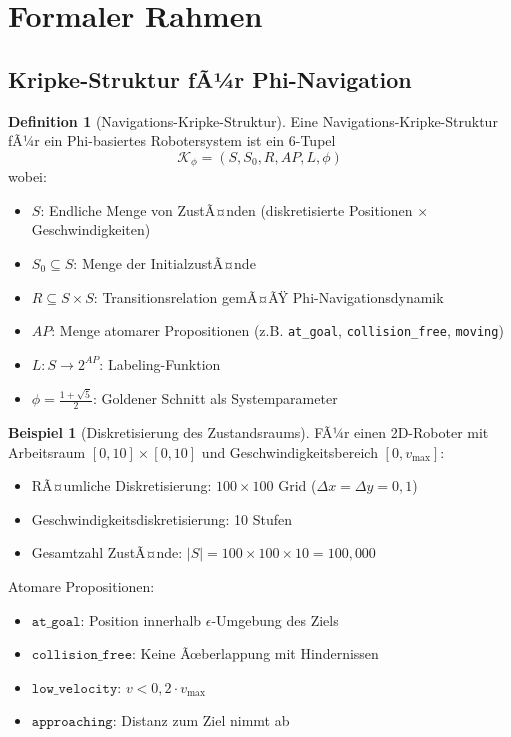 ﻿\documentclass[a4paper,12pt]{article}
\theoremstyle{definition}
\newtheorem{definition}{Definition}[section]
\newtheorem{beispiel}{Beispiel}[section]
\begin{document}
\section{Formaler Rahmen}

\subsection{Kripke-Struktur fÃ¼r Phi-Navigation}

\begin{definition}[Navigations-Kripke-Struktur]
Eine Navigations-Kripke-Struktur fÃ¼r ein Phi-basiertes Robotersystem ist ein 6-Tupel
\[
\mathcal{K}_{\phi} = (S, S_0, R, AP, L, \phi)
\]
wobei:
\begin{itemize}
	\item $S$: Endliche Menge von ZustÃ¤nden (diskretisierte Positionen $\times$ Geschwindigkeiten)
	\item $S_0 \subseteq S$: Menge der InitialzustÃ¤nde
	\item $R \subseteq S \times S$: Transitionsrelation gemÃ¤ÃŸ Phi-Navigationsdynamik
	\item $AP$: Menge atomarer Propositionen (z.B. \texttt{at\_goal}, \texttt{collision\_free}, \texttt{moving})
	\item $L: S \to 2^{AP}$: Labeling-Funktion
	\item $\phi = \frac{1+\sqrt{5}}{2}$: Goldener Schnitt als Systemparameter
\end{itemize}
\end{definition}

\begin{beispiel}[Diskretisierung des Zustandsraums]
FÃ¼r einen 2D-Roboter mit Arbeitsraum $[0,10] \times [0,10]$ und Geschwindigkeitsbereich $[0, v_{\max}]$:
\begin{itemize}
	\item RÃ¤umliche Diskretisierung: $100 \times 100$ Grid ($\Delta x = \Delta y = 0{,}1$)
	\item Geschwindigkeitsdiskretisierung: 10 Stufen
	\item Gesamtzahl ZustÃ¤nde: $|S| = 100 \times 100 \times 10 = 100{,}000$
\end{itemize}

Atomare Propositionen:
\begin{itemize}
	\item $\texttt{at\_goal}$: Position innerhalb $\epsilon$-Umgebung des Ziels
	\item $\texttt{collision\_free}$: Keine Ãœberlappung mit Hindernissen
	\item $\texttt{low\_velocity}$: $v < 0{,}2 \cdot v_{\max}$
	\item $\texttt{approaching}$: Distanz zum Ziel nimmt ab
\end{itemize}
\end{beispiel}
\end{document}
